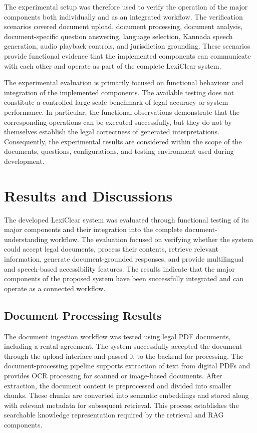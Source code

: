 \documentclass[12pt,a4paper,oneside]{report}
\begin{document}
The experimental setup was therefore used to verify the operation of the
major components both individually and as an integrated workflow. The
verification scenarios covered document upload, document processing, document
analysis, document-specific question answering, language selection, Kannada
speech generation, audio playback controls, and jurisdiction grounding. These
scenarios provide functional evidence that the implemented components can
communicate with each other and operate as part of the complete LexiClear
system.

The experimental evaluation is primarily focused on functional behaviour and
integration of the implemented components. The available testing does not
constitute a controlled large-scale benchmark of legal accuracy or system
performance. In particular, the functional observations demonstrate that the
corresponding operations can be executed successfully, but they do not by
themselves establish the legal correctness of generated interpretations.
Consequently, the experimental results are considered within the scope of the
documents, questions, configurations, and testing environment used during
development.

\section{Results and Discussions}

The developed LexiClear system was evaluated through functional testing of its major components and their integration into the complete document-understanding workflow. The evaluation focused on verifying whether the system could accept legal documents, process their contents, retrieve relevant information, generate document-grounded responses, and provide multilingual and speech-based accessibility features. The results indicate that the major components of the proposed system have been successfully integrated and can operate as a connected workflow.

\subsection{Document Processing Results}
The document ingestion workflow was tested using legal PDF documents, including a rental agreement. The system successfully accepted the document through the upload interface and passed it to the backend for processing. The document-processing pipeline supports extraction of text from digital PDFs and provides OCR processing for scanned or image-based documents. After extraction, the document content is preprocessed and divided into smaller chunks. These chunks are converted into semantic embeddings and stored along with relevant metadata for subsequent retrieval. This process establishes the searchable knowledge representation required by the retrieval and RAG components.
\end{document}
